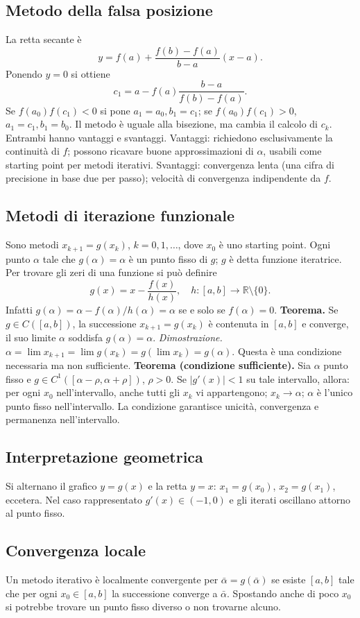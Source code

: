 \documentclass[11pt,a4paper]{article}
\newcommand{\R}{\mathbb R}\newcommand{\F}{\mathbb F}\newcommand{\tr}{\operatorname{tr}}\newcommand{\ar}{\operatorname{arr}}\newcommand{\fl}{\operatorname{fl}}
\newcommand{\pagina}[1]{\clearpage}
\begin{document}
\subsection*{Metodo della falsa posizione}
La retta secante è
\[y=f(a)+\frac{f(b)-f(a)}{b-a}(x-a).\]
Ponendo $y=0$ si ottiene
\[c_1=a-f(a)\frac{b-a}{f(b)-f(a)}.\]
Se $f(a_0)f(c_1)<0$ si pone $a_1=a_0,b_1=c_1$; se $f(a_0)f(c_1)>0$, $a_1=c_1,b_1=b_0$. Il metodo è uguale alla bisezione, ma cambia il calcolo di $c_k$. Entrambi hanno vantaggi e svantaggi.
\pagina{11}
Vantaggi: richiedono esclusivamente la continuità di $f$; possono ricavare buone approssimazioni di $\alpha$, usabili come starting point per metodi iterativi. Svantaggi: convergenza lenta (una cifra di precisione in base due per passo); velocità di convergenza indipendente da $f$.
\subsection*{Metodi di iterazione funzionale}
Sono metodi $x_{k+1}=g(x_k)$, $k=0,1,\ldots$, dove $x_0$ è uno starting point. Ogni punto $\alpha$ tale che $g(\alpha)=\alpha$ è un punto fisso di $g$; $g$ è detta funzione iteratrice. Per trovare gli zeri di una funzione si può definire
\[g(x)=x-\frac{f(x)}{h(x)},\quad h:[a,b]\to\R\setminus\{0\}.\]
Infatti $g(\alpha)=\alpha-f(\alpha)/h(\alpha)=\alpha$ se e solo se $f(\alpha)=0$.
\textbf{Teorema.} Se $g\in C([a,b])$, la successione $x_{k+1}=g(x_k)$ è contenuta in $[a,b]$ e converge, il suo limite $\alpha$ soddisfa $g(\alpha)=\alpha$.
\textit{Dimostrazione.} $\alpha=\lim x_{k+1}=\lim g(x_k)=g(\lim x_k)=g(\alpha)$.
\pagina{12}
Questa è una condizione necessaria ma non sufficiente.
\textbf{Teorema (condizione sufficiente).} Sia $\alpha$ punto fisso e $g\in C^1([\alpha-\rho,\alpha+\rho])$, $\rho>0$. Se $|g'(x)|<1$ su tale intervallo, allora: per ogni $x_0$ nell'intervallo, anche tutti gli $x_k$ vi appartengono; $x_k\to\alpha$; $\alpha$ è l'unico punto fisso nell'intervallo.
La condizione garantisce unicità, convergenza e permanenza nell'intervallo.
\subsection*{Interpretazione geometrica}
Si alternano il grafico $y=g(x)$ e la retta $y=x$: $x_1=g(x_0)$, $x_2=g(x_1)$, eccetera. Nel caso rappresentato $g'(x)\in(-1,0)$ e gli iterati oscillano attorno al punto fisso.
\subsection*{Convergenza locale}
Un metodo iterativo è localmente convergente per $\bar\alpha=g(\bar\alpha)$ se esiste $[a,b]$ tale che per ogni $x_0\in[a,b]$ la successione converge a $\bar\alpha$. Spostando anche di poco $x_0$ si potrebbe trovare un punto fisso diverso o non trovarne alcuno.
\pagina{13}
\end{document}
